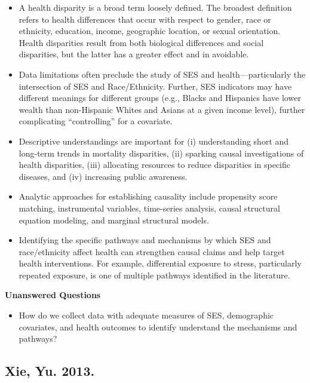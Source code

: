 \documentclass[
]{book}
\providecommand{\tightlist}{%
  \setlength{\itemsep}{0pt}\setlength{\parskip}{0pt}}
\begin{document}
\begin{itemize}
\tightlist
\item
  A health disparity is a broad term loosely defined. The broadest definition refers to health differences that occur with respect to gender, race or ethnicity, education, income, geographic location, or sexual orientation. Health disparities result from both biological differences and social disparities, but the latter has a greater effect and in avoidable.
\item
  Data limitations often preclude the study of SES and health---particularly the intersection of SES and Race/Ethnicity. Further, SES indicators may have different meanings for different groups (e.g., Blacks and Hispanics have lower wealth than non-Hispanic Whites and Asians at a given income level), further complicating ``controlling'' for a covariate.
\item
  Descriptive understandings are important for (i) understanding short and long-term trends in mortality disparities, (ii) sparking causal investigations of health disparities, (iii) allocating resources to reduce disparities in specific diseases, and (iv) increasing public awareness.
\item
  Analytic approaches for establishing causality include propensity score matching, instrumental variables, time-series analysis, causal structural equation modeling, and marginal structural models.\\
\item
  Identifying the specific pathways and mechanisms by which SES and race/ethnicity affect health can strengthen causal claims and help target health interventions. For example, differential exposure to stress, particularly repeated exposure, is one of multiple pathways identified in the literature.
\end{itemize}

\textbf{Unanswered Questions}

\begin{itemize}
\tightlist
\item
  How do we collect data with adequate measures of SES, demographic covariates, and health outcomes to identify understand the mechanisms and pathways?
\end{itemize}

\hypertarget{xie-yu.-2013.}{%
\subsection*{Xie, Yu. 2013.}\label{xie-yu.-2013.}}
\end{document}
